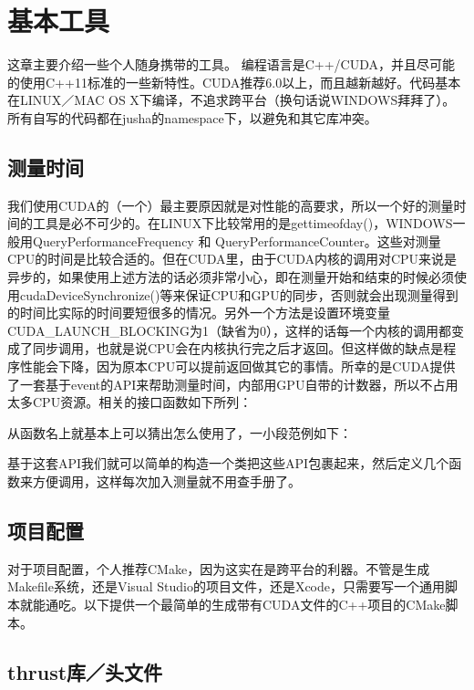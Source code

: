 \chapter{基本工具}

这章主要介绍一些个人随身携带的工具。 编程语言是C++/CUDA，并且尽可能的使用C++11标准的一些新特性。CUDA推荐6.0以上，而且越新越好。代码基本在LINUX／MAC OS X下编译，不追求跨平台（换句话说WINDOWS拜拜了）。所有自写的代码都在jusha的namespace下，以避免和其它库冲突。

\section{测量时间}
我们使用CUDA的（一个）最主要原因就是对性能的高要求，所以一个好的测量时间的工具是必不可少的。在LINUX下比较常用的是gettimeofday()，WINDOWS一般用QueryPerformanceFrequency 和 QueryPerformanceCounter。这些对测量CPU的时间是比较合适的。但在CUDA里，由于CUDA内核的调用对CPU来说是异步的，如果使用上述方法的话必须非常小心，即在测量开始和结束的时候必须使用cudaDeviceSynchronize()等来保证CPU和GPU的同步，否则就会出现测量得到的时间比实际的时间要短很多的情况。另外一个方法是设置环境变量CUDA\_LAUNCH\_BLOCKING为1（缺省为0），这样的话每一个内核的调用都变成了同步调用，也就是说CPU会在内核执行完之后才返回。但这样做的缺点是程序性能会下降，因为原本CPU可以提前返回做其它的事情。所幸的是CUDA提供了一套基于event的API来帮助测量时间，内部用GPU自带的计数器，所以不占用太多CPU资源。相关的接口函数如下所列：
\myvspace


从函数名上就基本上可以猜出怎么使用了，一小段范例如下：
\myvspace

 
基于这套API我们就可以简单的构造一个类把这些API包裹起来，然后定义几个函数来方便调用，这样每次加入测量就不用查手册了。

\section{项目配置}
对于项目配置，个人推荐CMake，因为这实在是跨平台的利器。不管是生成Makefile系统，还是Visual Studio的项目文件，还是Xcode，只需要写一个通用脚本就能通吃。以下提供一个最简单的生成带有CUDA文件的C++项目的CMake脚本。
\myvspace


\section{thrust库／头文件}

